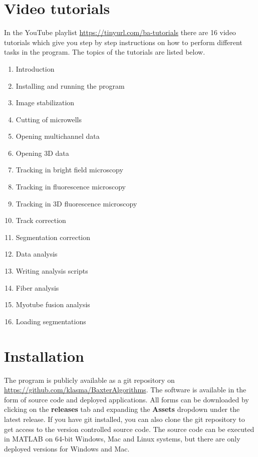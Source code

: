 \documentclass[a4paper, oneside, onecolumn, 11pt]{article}
\newcommand{\control}[1]{\textbf{#1}}
\begin{document}
\section{Video tutorials}
In the YouTube playlist \url{https://tinyurl.com/ba-tutorials} there are 16 video tutorials which give you step by step instructions on how to perform different tasks in the program. The topics of the tutorials are listed below.

\begin{enumerate}
\item Introduction
\item Installing and running the program
\item Image stabilization
\item Cutting of microwells
\item Opening multichannel data
\item Opening 3D data
\item Tracking in bright field microscopy
\item Tracking in fluorescence microscopy
\item Tracking in 3D fluorescence microscopy
\item Track correction
\item Segmentation correction
\item Data analysis
\item Writing analysis scripts
\item Fiber analysis
\item Myotube fusion analysis
\item Loading segmentations
\end{enumerate}

\section{Installation}
\label{sec:installation}
The program is publicly available as a git repository on \url{https://github.com/klasma/BaxterAlgorithms}. The software is available in the form of source code and deployed applications. All forms can be downloaded by clicking on the \control{releases} tab and expanding the \control{Assets} dropdown under the latest release. If you have git installed, you can also clone the git repository to get access to the version controlled source code. The source code can be executed in MATLAB on 64-bit Windows, Mac and Linux systems, but there are only deployed versions for Windows and Mac.
\end{document}
